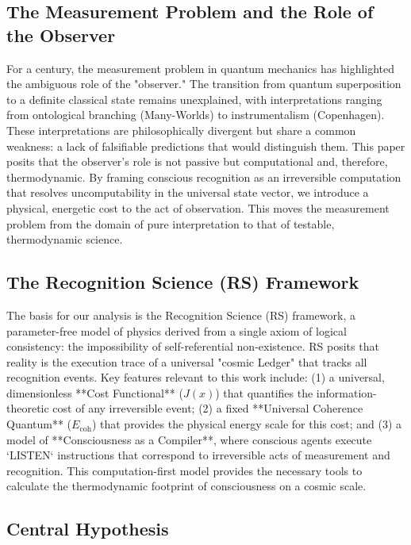 \documentclass[11pt,a4paper]{article}
\theoremstyle{definition}
\theoremstyle{remark}
\begin{document}
\subsection{The Measurement Problem and the Role of the Observer}

For a century, the measurement problem in quantum mechanics has highlighted the ambiguous role of the "observer." The transition from quantum superposition to a definite classical state remains unexplained, with interpretations ranging from ontological branching (Many-Worlds) to instrumentalism (Copenhagen). These interpretations are philosophically divergent but share a common weakness: a lack of falsifiable predictions that would distinguish them. This paper posits that the observer's role is not passive but computational and, therefore, thermodynamic. By framing conscious recognition as an irreversible computation that resolves uncomputability in the universal state vector, we introduce a physical, energetic cost to the act of observation. This moves the measurement problem from the domain of pure interpretation to that of testable, thermodynamic science.

\subsection{The Recognition Science (RS) Framework}

The basis for our analysis is the Recognition Science (RS) framework, a parameter-free model of physics derived from a single axiom of logical consistency: the impossibility of self-referential non-existence. RS posits that reality is the execution trace of a universal "cosmic Ledger" that tracks all recognition events. Key features relevant to this work include: (1) a universal, dimensionless **Cost Functional** (\(J(x)\)) that quantifies the information-theoretic cost of any irreversible event; (2) a fixed **Universal Coherence Quantum** (\(E_{\text{coh}}\)) that provides the physical energy scale for this cost; and (3) a model of **Consciousness as a Compiler**, where conscious agents execute `LISTEN` instructions that correspond to irreversible acts of measurement and recognition. This computation-first model provides the necessary tools to calculate the thermodynamic footprint of consciousness on a cosmic scale.

\subsection{Central Hypothesis}
\end{document}
